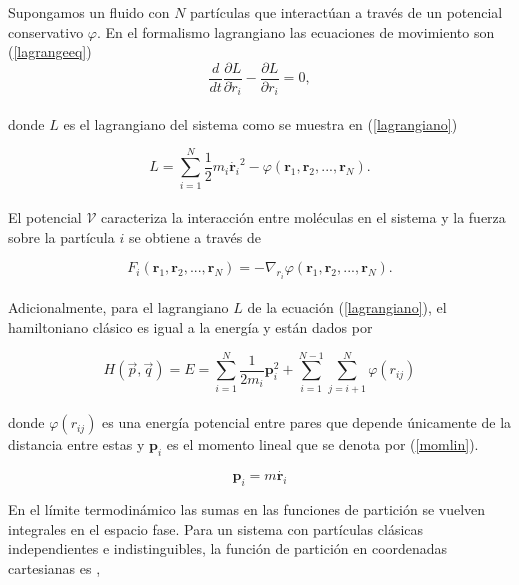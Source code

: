 Supongamos un fluido con $N$ partículas que interactúan a través de un potencial conservativo $\varphi$. En el formalismo lagrangiano las ecuaciones de movimiento son (\ref{lagrangeeq}) \cite{torresdelcastillo_2018}\\

\begin{equation} \label{lagrangeeq}
    \frac{d}{dt}\frac{\partial L}{\partial \dot r_i} - \frac{\partial L}{\partial r_i} = 0,
\end{equation}\\
donde $L$ es el lagrangiano del sistema como se muestra en (\ref{lagrangiano})

\begin{equation} \label{lagrangiano}
    L = \sum_{i=1}^{N} \frac{1}{2}m_i\dot{\mathbf{r}_i}^2-\varphi \left({\mathbf{r}}_1,{\mathbf{r}}_2,...,{\mathbf{r}}_N\right).
\end{equation}\\
El potencial $\mathcal{V}$ caracteriza la interacción entre moléculas en el sistema \cite{torresdelcastillo_2018} y la fuerza sobre la partícula $i$ se obtiene a través de

\begin{equation}
    F_i({\mathbf{r}}_1,{\mathbf{r}}_2,...,{\mathbf{r}}_N) = -\nabla_{r_i}\varphi({\mathbf{r}}_1,{\mathbf{r}}_2,...,{\mathbf{r}}_N).
\end{equation}\\

Adicionalmente, para el lagrangiano $L$ de la ecuación (\ref{lagrangiano}), el hamiltoniano clásico es igual a la energía y están dados por

\begin{equation} \label{hamiltoniano}
    H(\vec{p},\vec{q}) = E = \sum_{i=1}^{N} \frac{1}{2 m_i}\mathbf{p}_i^2 + \sum_{i=1}^{N-1}\sum_{j=i+1}^{N} \varphi(r_{ij})
\end{equation}\\

donde $\varphi(r_{ij})$ es una energía potencial entre pares que depende únicamente de la distancia entre estas y $\mathbf{p}_i$ es el momento lineal que se denota por (\ref{momlin}).

\begin{equation}\label{momlin}
    \mathbf{p}_i = m\dot{\mathbf{r}_i}
\end{equation}

En el límite termodinámico las sumas en las funciones de partición se vuelven integrales en el espacio fase. Para un sistema con partículas clásicas independientes e indistinguibles, la función de partición en coordenadas cartesianas es \cite{mcquarrie1976},

